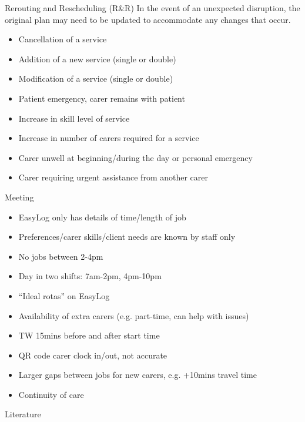 \documentclass[usenames,dvipsnames]{beamer}
\begin{document}
\begin{frame}{Rerouting and Rescheduling (R\&R)}
In the event of an unexpected disruption, the original plan may need to be updated to accommodate any changes that occur.

\small
\begin{itemize}
	\item Cancellation of a service
	\item Addition of a new service (single or double)
	\item Modification of a service (single or double)
	\item Patient emergency, carer remains with patient
	\item Increase in skill level of service
	\item Increase in number of carers required for a service
	\item Carer unwell at beginning/during the day or personal emergency
	\item Carer requiring urgent assistance from another carer
\end{itemize}	
\end{frame}

\begin{frame}{Meeting}
\small
\begin{itemize}
	\item EasyLog only has details of time/length of job
	\item Preferences/carer skills/client needs are known by staff only
	\item No jobs between 2-4pm
	\item Day in two shifts: 7am-2pm, 4pm-10pm
	\item ``Ideal rotas'' on EasyLog
	\item Availability of extra carers (e.g. part-time, can help with issues)
	\item TW 15mins before and after start time
	\item QR code carer clock in/out, not accurate
	\item Larger gaps between jobs for new carers, e.g. +10mins travel time
	\item Continuity of care
\end{itemize}	
	
\end{frame}

\begin{frame}{Literature}

\end{frame}
\end{document}
